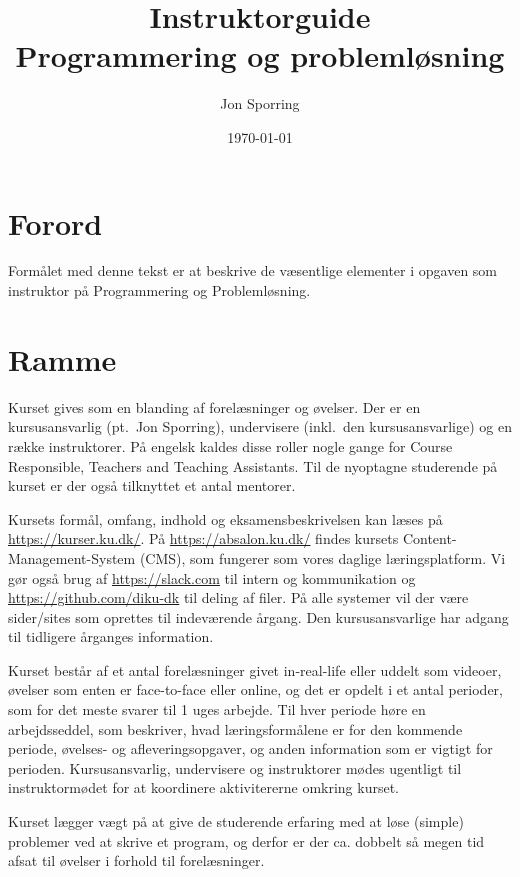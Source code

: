 \documentclass[a4paper]{article}
\title{Instruktorguide\\Programmering og problemløsning}
\author{Jon Sporring}
\date{\today}
\begin{document}
\maketitle

\section{Forord}
Formålet med denne tekst er at beskrive de væsentlige elementer i
opgaven som instruktor på Programmering og Problemløsning.

\section{Ramme}
Kurset gives som en blanding af forelæsninger og øvelser. Der er en
kursusansvarlig (pt.\ Jon Sporring), undervisere (inkl.\ den
kursusansvarlige) og en række instruktorer. På engelsk kaldes disse
roller nogle gange for Course Responsible, Teachers and Teaching
Assistants. Til de nyoptagne studerende på kurset er der også
tilknyttet et antal mentorer.

Kursets formål, omfang, indhold og eksamensbeskrivelsen kan læses på
\url{https://kurser.ku.dk/}. På \url{https://absalon.ku.dk/} findes
kursets Content-Management-System (CMS), som fungerer som vores
daglige læringsplatform. Vi gør også brug af \url{https://slack.com}
til intern og kommunikation og \url{https://github.com/diku-dk} til
deling af filer. På alle systemer vil der være sider/sites som
oprettes til indeværende årgang. Den kursusansvarlige har adgang til
tidligere årganges information.

Kurset består af et antal forelæsninger givet in-real-life eller
uddelt som videoer, øvelser som enten er face-to-face eller online, og
det er opdelt i et antal perioder, som for det meste svarer til 1 uges
arbejde. Til hver periode høre en arbejdsseddel, som beskriver, hvad
læringsformålene er for den kommende periode, øvelses- og
afleveringsopgaver, og anden information som er vigtigt for
perioden. Kursusansvarlig, undervisere og instruktorer mødes ugentligt
til instruktormødet for at koordinere aktivitererne omkring kurset.

Kurset lægger vægt på at give de studerende erfaring med at løse
(simple) problemer ved at skrive et program, og derfor er der
ca. dobbelt så megen tid afsat til øvelser i forhold til
forelæsninger.
\end{document}
